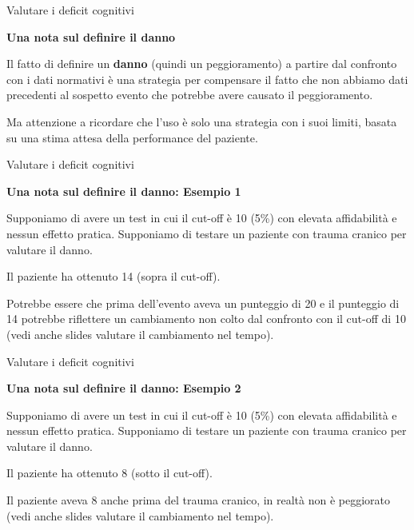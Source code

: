 \documentclass[
  ignorenonframetext,
]{beamer}
\begin{document}
\begin{frame}{Valutare i deficit cognitivi}
\label{valutare-i-deficit-cognitivi-10}
\begin{center}
  \textbf{Una nota sul definire il danno}
\end{center}
\vspace{2em}

Il fatto di definire un \textbf{danno} (quindi un peggioramento) a
partire dal confronto con i dati normativi è una strategia per
compensare il fatto che non abbiamo dati precedenti al sospetto evento
che potrebbe avere causato il peggioramento.

Ma attenzione a ricordare che l'uso è solo una strategia con i suoi
limiti, basata su una stima attesa della performance del paziente.
\end{frame}

\begin{frame}{Valutare i deficit cognitivi}
\label{valutare-i-deficit-cognitivi-11}
\begin{center}
  \textbf{Una nota sul definire il danno: Esempio 1}
\end{center}
\vspace{2em}

Supponiamo di avere un test in cui il cut-off è 10 (5\%) con elevata
affidabilità e nessun effetto pratica. Supponiamo di testare un paziente
con trauma cranico per valutare il danno.

Il paziente ha ottenuto 14 (sopra il cut-off).

Potrebbe essere che prima dell'evento aveva un punteggio di 20 e il
punteggio di 14 potrebbe riflettere un cambiamento non colto dal
confronto con il cut-off di 10 (vedi anche slides valutare il
cambiamento nel tempo).
\end{frame}

\begin{frame}{Valutare i deficit cognitivi}
\label{valutare-i-deficit-cognitivi-12}
\begin{center}
  \textbf{Una nota sul definire il danno: Esempio 2}
\end{center}
\vspace{2em}

Supponiamo di avere un test in cui il cut-off è 10 (5\%) con elevata
affidabilità e nessun effetto pratica. Supponiamo di testare un paziente
con trauma cranico per valutare il danno.

Il paziente ha ottenuto 8 (sotto il cut-off).

Il paziente aveva 8 anche prima del trauma cranico, in realtà non è
peggiorato (vedi anche slides valutare il cambiamento nel tempo).
\end{frame}
\end{document}
